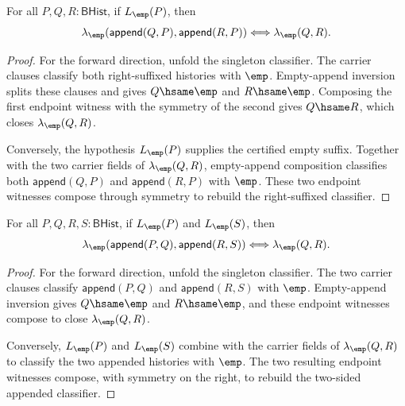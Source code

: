 \begin{theorem}
\label{thm:linearmap-singleton-classifier-append-right-cancel-iff}
For all $P,Q,R:\mathsf{BHist}$, if $L_{\emp}(P)$, then
$$
\lambda_{\emp}(\mathsf{append}(Q,P),\mathsf{append}(R,P))
\Longleftrightarrow
\lambda_{\emp}(Q,R).
$$
\end{theorem}
\begin{proof}
For the forward direction, unfold the singleton classifier. The carrier
clauses classify both right-suffixed histories with $\emp$. Empty-append
inversion splits these clauses and gives $Q\hsame\emp$ and $R\hsame\emp$.
Composing the first endpoint witness with the symmetry of the second gives
$Q\hsame R$, which closes $\lambda_{\emp}(Q,R)$.

Conversely, the hypothesis $L_{\emp}(P)$ supplies the certified empty suffix.
Together with the two carrier fields of $\lambda_{\emp}(Q,R)$, empty-append
composition classifies both $\mathsf{append}(Q,P)$ and
$\mathsf{append}(R,P)$ with $\emp$. These two endpoint witnesses compose
through symmetry to rebuild the right-suffixed classifier.
\end{proof}

\begin{theorem}
\label{thm:linearmap-singleton-classifier-append-two-sided-cancel}
For all $P,Q,R,S:\mathsf{BHist}$, if $L_{\emp}(P)$ and $L_{\emp}(S)$, then
$$
\lambda_{\emp}(\mathsf{append}(P,Q),\mathsf{append}(R,S))
\Longleftrightarrow
\lambda_{\emp}(Q,R).
$$
\end{theorem}
\begin{proof}
For the forward direction, unfold the singleton classifier. The two carrier
clauses classify $\mathsf{append}(P,Q)$ and $\mathsf{append}(R,S)$ with
$\emp$. Empty-append inversion gives $Q\hsame\emp$ and $R\hsame\emp$, and
these endpoint witnesses compose to close $\lambda_{\emp}(Q,R)$.

Conversely, $L_{\emp}(P)$ and $L_{\emp}(S)$ combine with the carrier fields of
$\lambda_{\emp}(Q,R)$ to classify the two appended histories with $\emp$.
The two resulting endpoint witnesses compose, with symmetry on the right, to
rebuild the two-sided appended classifier.
\end{proof}

